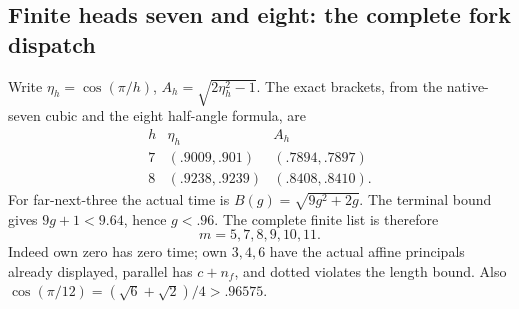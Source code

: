 \subsection{Finite heads seven and eight: the complete fork dispatch}
\label{app:D18finite78forks}

Write \(\eta_h=\cos(\pi/h)\),
\(A_h=\sqrt{2\eta_h^2-1}\).
The exact brackets, from the native-seven cubic and the
eight half-angle formula, are
\[
 \begin{array}{c|cc}
 h&\eta_h&A_h\\ \hline
 7&(.9009,.901)&(.7894,.7897)\\
 8&(.9238,.9239)&(.8408,.8410).
 \end{array}
\tag{DFheadbrackets}\label{eq:DFheadbrackets}
\]
For far-next-three the actual time is \(B(g)=\sqrt{9g^2+2g}\).
The terminal bound gives \(9g+1<9.64\), hence \(g<.96\).
The complete finite list is therefore
\[
                         m=5,7,8,9,10,11 .
\]
Indeed own zero has zero time; own \(3,4,6\) have the actual
affine principals already displayed, parallel has \(c+n_f\),
and dotted violates the length bound.
Also \(\cos(\pi/12)=(\sqrt6+\sqrt2)/4>.96575\).

